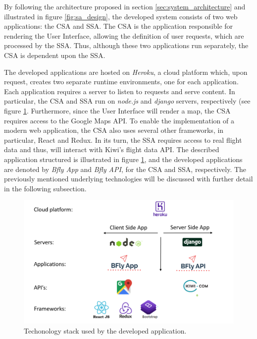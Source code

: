 By following the architecture proposed in section \ref{sec:system_architecture} and illustrated in figure \ref{fig:sa_design}, the developed system consists of two web applications: the CSA and SSA. The CSA is the application responsible for rendering the User Interface, allowing the definition of user requests, which are processed by the SSA. Thus, although these two applications run separately, the CSA is dependent upon the SSA. 



The developed applications are hosted on \textit{Heroku}, a cloud platform which, upon request, creates two separate runtime environments, one for each application. Each application requires a server to listen to requests and serve content. In particular, the CSA and SSA run on \textit{node.js} and \textit{django} servers, respectively (see figure \ref{fig:sa_structure}. Furthermore, since the User Interface will render a map, the CSA requires access to the Google Maps API. To enable the implementation of a modern web application, the CSA also uses several other frameworks, in particular, React and Redux. In its turn, the SSA requires access to real flight data and thus, will interact with Kiwi's flight data API. The described application structured is illustrated in figure \ref{fig:sa_structure}, and the developed applications are denoted by \textit{Bfly App} and \textit{Bfly API}, for the CSA and SSA, respectively. The previously mentioned underlying technologies will be discussed with further detail in the following subsection.  



\begin{figure}[htpb]
  \centering
  \includegraphics[width=.7\textwidth]{./Figures/system_implementation/system_architecture_implementation.png}
  \caption{Techonology stack used by the developed application.}
  \label{fig:sa_structure}  
\end{figure}


